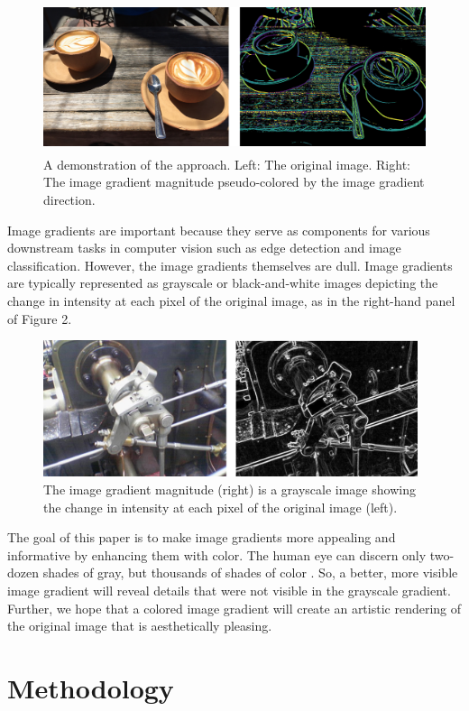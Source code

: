 \documentclass[runningheads]{llncs}
\begin{document}
\begin{figure}
\centering
\includegraphics[height=4.4cm]{images/intro.png}
\caption{A demonstration of the approach. Left: The original image. Right: The image gradient magnitude pseudo-colored by the image gradient direction.}
\label{fig:example}
\end{figure}

Image gradients are important because they serve as components for various downstream tasks in computer vision such as edge detection and image classification. However, the image gradients themselves are dull. Image gradients are typically represented as grayscale or black-and-white images depicting the change in intensity at each pixel of the original image, as in the right-hand panel of Figure 2.

\begin{figure}
\centering
\includegraphics[height=4cm]{images/image_gradient.png}
\caption{The image gradient magnitude (right) is a grayscale image showing the change in intensity at each pixel of the original image (left).}
\label{fig:example}
\end{figure}

The goal of this paper is to make image gradients more appealing and informative by enhancing them with color. The human eye can discern only two-dozen shades of gray, but thousands of shades of color \cite{human_machine}. So, a better, more visible image gradient will reveal details that were not visible in the grayscale gradient. Further, we hope that a colored image gradient will create an artistic rendering of the original image that is aesthetically pleasing.

\section{Methodology}
\end{document}
